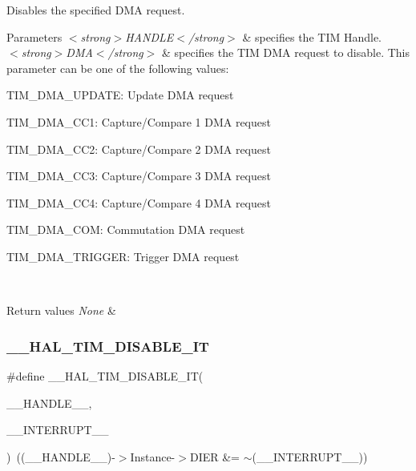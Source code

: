 Disables the specified D\+MA request. 


\begin{DoxyParams}{Parameters}
{\em $<$strong$>$\+H\+A\+N\+D\+L\+E$<$/strong$>$} & specifies the T\+IM Handle. \\
\hline
{\em $<$strong$>$\+D\+M\+A$<$/strong$>$} & specifies the T\+IM D\+MA request to disable. This parameter can be one of the following values\+: \begin{DoxyItemize}
\item T\+I\+M\+\_\+\+D\+M\+A\+\_\+\+U\+P\+D\+A\+TE\+: Update D\+MA request \item T\+I\+M\+\_\+\+D\+M\+A\+\_\+\+C\+C1\+: Capture/\+Compare 1 D\+MA request \item T\+I\+M\+\_\+\+D\+M\+A\+\_\+\+C\+C2\+: Capture/\+Compare 2 D\+MA request \item T\+I\+M\+\_\+\+D\+M\+A\+\_\+\+C\+C3\+: Capture/\+Compare 3 D\+MA request \item T\+I\+M\+\_\+\+D\+M\+A\+\_\+\+C\+C4\+: Capture/\+Compare 4 D\+MA request \item T\+I\+M\+\_\+\+D\+M\+A\+\_\+\+C\+OM\+: Commutation D\+MA request \item T\+I\+M\+\_\+\+D\+M\+A\+\_\+\+T\+R\+I\+G\+G\+ER\+: Trigger D\+MA request \end{DoxyItemize}
\\
\hline
\end{DoxyParams}

\begin{DoxyRetVals}{Return values}
{\em None} & \\
\hline
\end{DoxyRetVals}
\mbox{\label{group___t_i_m___exported___macros_ga31d67e905bc62e3142179dc4bbf8ba64}} 
\subsubsection{\texorpdfstring{\+\_\+\+\_\+\+H\+A\+L\+\_\+\+T\+I\+M\+\_\+\+D\+I\+S\+A\+B\+L\+E\+\_\+\+IT}{\_\_HAL\_TIM\_DISABLE\_IT}}
{\footnotesize\ttfamily \#define \+\_\+\+\_\+\+H\+A\+L\+\_\+\+T\+I\+M\+\_\+\+D\+I\+S\+A\+B\+L\+E\+\_\+\+IT(\begin{DoxyParamCaption}\item[{}]{\+\_\+\+\_\+\+H\+A\+N\+D\+L\+E\+\_\+\+\_\+,  }\item[{}]{\+\_\+\+\_\+\+I\+N\+T\+E\+R\+R\+U\+P\+T\+\_\+\+\_\+ }\end{DoxyParamCaption})~((\+\_\+\+\_\+\+H\+A\+N\+D\+L\+E\+\_\+\+\_\+)-\/$>$Instance-\/$>$D\+I\+ER \&= $\sim$(\+\_\+\+\_\+\+I\+N\+T\+E\+R\+R\+U\+P\+T\+\_\+\+\_\+))}



